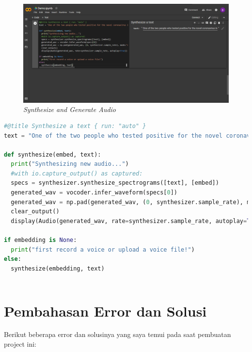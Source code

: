 \begin{enumerate}
\begin{figure}[H]
    \centering
    \includegraphics[scale=0.3]{figures/tutor6}
    \caption{\textit{Synthesize and Generate Audio}}
    \label{tutor6}
\end{figure}

\begin{lstlisting}[language=Python, caption=Synthesize dan Generate Audio Output]
#@title Synthesize a text { run: "auto" }
text = "One of the two people who tested positive for the novel coronavirus in the United Kingdom is a student at the University of York in northern England." #@param {type:"string"}
  
def synthesize(embed, text):
  print("Synthesizing new audio...")
  #with io.capture_output() as captured:
  specs = synthesizer.synthesize_spectrograms([text], [embed])
  generated_wav = vocoder.infer_waveform(specs[0])
  generated_wav = np.pad(generated_wav, (0, synthesizer.sample_rate), mode="constant")
  clear_output()
  display(Audio(generated_wav, rate=synthesizer.sample_rate, autoplay=True))

if embedding is None:
  print("first record a voice or upload a voice file!")
else:
  synthesize(embedding, text)
    
\end{lstlisting}
\end{enumerate}

\section{Pembahasan Error dan Solusi}
Berikut beberapa error dan solusinya yang saya temui pada saat pembuatan project ini:

